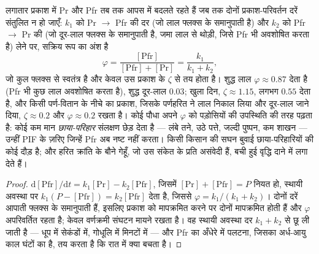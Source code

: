\begin{proposition}[फ़ाइटोक्रोम का प्रकाश-साम्य]\label{prop:b3:plant-molecular-physiology:photoequilibrium}
लगातार प्रकाश में Pr और Pfr तब तक आपस में बदलते रहते हैं जब तक दोनों
प्रकाश-परिवर्तन दरें संतुलित न हो जाएँ: $k_{1}$ को Pr $\to$ Pfr की दर
(जो लाल फ्लक्स के समानुपाती है) और $k_{2}$ को Pfr $\to$ Pr की
(जो दूर-लाल फ्लक्स के समानुपाती है, जमा लाल से थोड़ी, जिसे Pfr भी
अवशोषित करता है) लेने पर, सक्रिय रूप का अंश है
\[
\varphi = \frac{[\text{Pfr}]}{[\text{Pfr}] + [\text{Pr}]} = \frac{k_{1}}{k_{1} + k_{2}},
\]
जो कुल फ्लक्स से स्वतंत्र है और केवल उस प्रकाश के \emph{} $\zeta$ से तय होता है। शुद्ध लाल $\varphi \approx 0.87$ देता है
(Pfr भी कुछ लाल अवशोषित करता है), शुद्ध दूर-लाल $0.03$; खुला दिन,
$\zeta \approx
1.15$, लगभग $0.55$ देता है, और किसी पर्ण-वितान के नीचे का प्रकाश, जिसके
पर्णहरित ने लाल निकाल लिया और दूर-लाल जाने दिया, $\zeta \approx 0.2$
और $\varphi \approx 0.2$ रखता है। कोई पौधा अपने $\varphi$ को पड़ोसियों
की उपस्थिति की तरह पढ़ता है: कोई कम मान \emph{छाया-परिहार} संलक्षण छेड़
देता है --- लंबे तने, उठे पत्ते, जल्दी पुष्पन, कम शाखन --- उन्हीं PIF
के ज़रिए जिन्हें Pfr अब नष्ट नहीं करता। किसी किसान की सघन बुवाई
छाया-परिहारियों की कोई दौड़ है; और हरित क्रांति के बौने गेहूँ, जो उस
संकेत के प्रति असंवेदी हैं, बची हुई वृद्धि दाने में लगा देते हैं।
\end{proposition}
\begin{proof}
$\mathrm{d}[\text{Pfr}]/\mathrm{d}t = k_{1}[\text{Pr}] - k_{2}[\text{Pfr}]$,
जिसमें $[\text{Pr}] + [\text{Pfr}] = P$ नियत हो, स्थायी अवस्था पर
$k_{1}(P - [\text{Pfr}]) = k_{2}[\text{Pfr}]$ देता है, जिससे $\varphi = k_{1}/
(k_{1} + k_{2})$। दोनों दरें आपाती फ्लक्स के समानुपाती हैं, इसलिए
प्रकाश को मापक्रमित करने पर दोनों मापक्रमित होती हैं और $\varphi$
अपरिवर्तित रहता है; केवल वर्णक्रमी संघटन मायने रखता है। वह स्थायी अवस्था
दर $k_{1} + k_{2}$ से छू ली जाती है --- धूप में सेकंडों में, गोधूलि में
मिनटों में --- और Pfr का अँधेरे में पलटना, जिसका अर्ध-आयु काल घंटों का
है, तय करता है कि रात में क्या बचता है।
\end{proof}

